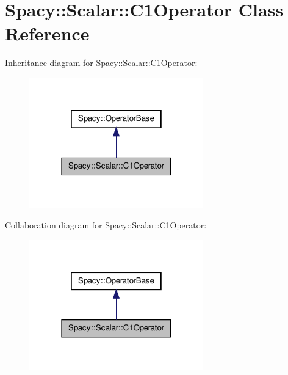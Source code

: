 \hypertarget{classSpacy_1_1Scalar_1_1C1Operator}{\section{\-Spacy\-:\-:\-Scalar\-:\-:\-C1\-Operator \-Class \-Reference}
\label{classSpacy_1_1Scalar_1_1C1Operator}
}


\-Inheritance diagram for \-Spacy\-:\-:\-Scalar\-:\-:\-C1\-Operator\-:
\nopagebreak
\begin{figure}[H]
\begin{center}
\leavevmode
\includegraphics[width=214pt]{classSpacy_1_1Scalar_1_1C1Operator__inherit__graph}
\end{center}
\end{figure}


\-Collaboration diagram for \-Spacy\-:\-:\-Scalar\-:\-:\-C1\-Operator\-:
\nopagebreak
\begin{figure}[H]
\begin{center}
\leavevmode
\includegraphics[width=214pt]{classSpacy_1_1Scalar_1_1C1Operator__coll__graph}
\end{center}
\end{figure}
